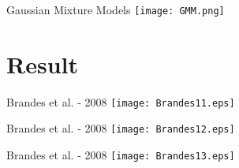 \documentclass{beamer}
\begin{document}
	\begin{frame}{Gaussian Mixture Models}
		\centering
		\texttt{[image: GMM.png]}
	\end{frame}

\section{Result}
	\begin{frame}{Brandes et al. - 2008}
		\centering
		\texttt{[image: Brandes11.eps]}
	\end{frame}

	\begin{frame}{Brandes et al. - 2008}
		\centering
		\texttt{[image: Brandes12.eps]}
	\end{frame}

	\begin{frame}{Brandes et al. - 2008}
		\centering
		\texttt{[image: Brandes13.eps]}
	\end{frame}
\end{document}
